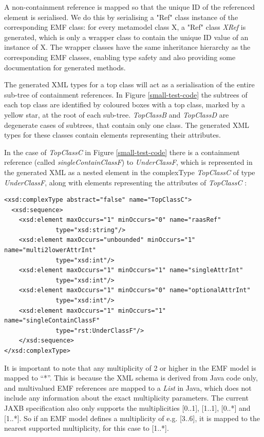 \documentclass[11pt]{article}
\begin{document}
A non-containment reference is mapped so that the unique ID of the referenced element is serialised. We do this by serialising a "Ref" class instance of the corresponding EMF class: for every metamodel class X, a "Ref" class {\em XRef} is generated, which is only a wrapper class to contain the unique ID value of an instance of X. The wrapper classes have the same inheritance hierarchy as the corresponding EMF classes, enabling type safety and also providing some documentation for generated methods.

The generated XML types for a top class will act as a serialisation of the entire sub-tree of containment references. In Figure \ref{small-test-code} the subtrees of each top class are identified by coloured boxes with a top class, marked by a yellow star, at the root of each sub-tree. {\em TopClassB} and {\em TopClassD} are degenerate cases of subtrees, that contain only one class. The generated XML types for these classes contain elements representing their attributes.

In the case of {\em TopClassC} in Figure \ref{small-test-code} there is a containment reference (called {\em singleContainClassF}) to {\em UnderClassF}, which is represented in the generated XML as a nested element in the complexType  {\em TopClassC} of type  {\em UnderClassF}, along with elements representing the attributes of {\em TopClassC} :
\begin{verbatim}
<xsd:complexType abstract="false" name="TopClassC">
  <xsd:sequence>
    <xsd:element maxOccurs="1" minOccurs="0" name="raasRef"
              type="xsd:string"/>
    <xsd:element maxOccurs="unbounded" minOccurs="1" name="multi2lowerAttrInt" 
              type="xsd:int"/>
    <xsd:element maxOccurs="1" minOccurs="1" name="singleAttrInt" 
              type="xsd:int"/>
    <xsd:element maxOccurs="1" minOccurs="0" name="optionalAttrInt" 
              type="xsd:int"/>
    <xsd:element maxOccurs="1" minOccurs="1" name="singleContainClassF" 
              type="rst:UnderClassF"/>
    </xsd:sequence>
</xsd:complexType>
\end{verbatim}

It is important to note that any multiplicity of 2 or higher in the EMF model is mapped to ``*''. This is because the XML schema is derived from Java code only, and multivalued EMF references are mapped to a {\em List} in Java, which does not include any information about the exact multiplicity parameters. The current JAXB specification also only supports the multiplicities [0..1], [1..1], [0..*] and [1..*]. So if an EMF model defines a multiplicity of e.g. [3..6], it is mapped to the nearest supported multiplicity, for this case to [1..*].
\end{document}

